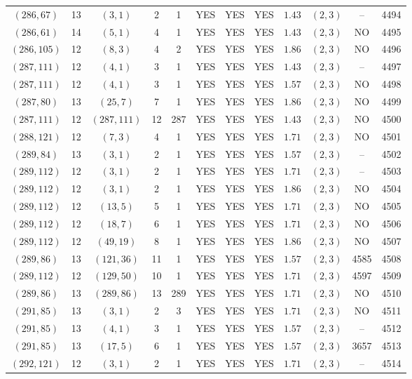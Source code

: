 \begin{longtable}{|c|c|c|c|c|c|c|c|c|c|c|c|}
$(286,67)$ & 13 & $(3,1)$ & 2 & 1 & YES & YES & YES & $1.43$ & $(2,3)$ & -- & 4494\\
$(286,61)$ & 14 & $(5,1)$ & 4 & 1 & YES & YES & YES & $1.43$ & $(2,3)$ & NO & 4495\\
$(286,105)$ & 12 & $(8,3)$ & 4 & 2 & YES & YES & YES & $1.86$ & $(2,3)$ & NO & 4496\\
$(287,111)$ & 12 & $(4,1)$ & 3 & 1 & YES & YES & YES & $1.43$ & $(2,3)$ & -- & 4497\\
$(287,111)$ & 12 & $(4,1)$ & 3 & 1 & YES & YES & YES & $1.57$ & $(2,3)$ & NO & 4498\\
$(287,80)$ & 13 & $(25,7)$ & 7 & 1 & YES & YES & YES & $1.86$ & $(2,3)$ & NO & 4499\\
$(287,111)$ & 12 & $(287,111)$ & 12 & 287 & YES & YES & YES & $1.43$ & $(2,3)$ & NO & 4500\\
$(288,121)$ & 12 & $(7,3)$ & 4 & 1 & YES & YES & YES & $1.71$ & $(2,3)$ & NO & 4501\\
$(289,84)$ & 13 & $(3,1)$ & 2 & 1 & YES & YES & YES & $1.57$ & $(2,3)$ & -- & 4502\\
$(289,112)$ & 12 & $(3,1)$ & 2 & 1 & YES & YES & YES & $1.71$ & $(2,3)$ & -- & 4503\\
$(289,112)$ & 12 & $(3,1)$ & 2 & 1 & YES & YES & YES & $1.86$ & $(2,3)$ & NO & 4504\\
$(289,112)$ & 12 & $(13,5)$ & 5 & 1 & YES & YES & YES & $1.71$ & $(2,3)$ & NO & 4505\\
$(289,112)$ & 12 & $(18,7)$ & 6 & 1 & YES & YES & YES & $1.71$ & $(2,3)$ & NO & 4506\\
$(289,112)$ & 12 & $(49,19)$ & 8 & 1 & YES & YES & YES & $1.86$ & $(2,3)$ & NO & 4507\\
$(289,86)$ & 13 & $(121,36)$ & 11 & 1 & YES & YES & YES & $1.57$ & $(2,3)$ & 4585 & 4508\\
$(289,112)$ & 12 & $(129,50)$ & 10 & 1 & YES & YES & YES & $1.71$ & $(2,3)$ & 4597 & 4509\\
$(289,86)$ & 13 & $(289,86)$ & 13 & 289 & YES & YES & YES & $1.71$ & $(2,3)$ & NO & 4510\\
$(291,85)$ & 13 & $(3,1)$ & 2 & 3 & YES & YES & YES & $1.71$ & $(2,3)$ & NO & 4511\\
$(291,85)$ & 13 & $(4,1)$ & 3 & 1 & YES & YES & YES & $1.57$ & $(2,3)$ & -- & 4512\\
$(291,85)$ & 13 & $(17,5)$ & 6 & 1 & YES & YES & YES & $1.57$ & $(2,3)$ & 3657 & 4513\\
$(292,121)$ & 12 & $(3,1)$ & 2 & 1 & YES & YES & YES & $1.71$ & $(2,3)$ & -- & 4514\\

\end{longtable}
